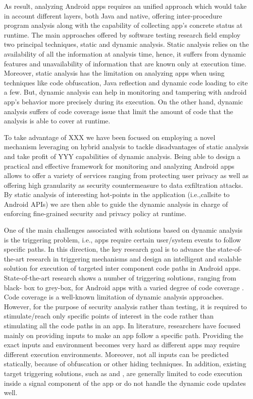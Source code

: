 As result, analyzing Android apps requires an unified approach which would take in account different layers, both Java and native, offering inter-procedure program analysis along with the capability of collecting app's concrete status at runtime. The main approaches offered by software testing research field employ two principal techniques, static and dynamic analysis. Static analysis relies on the availability of all the information at analysis time, hence, it suffers  from dynamic features and unavailability of information that are known only at execution time. Moreover, static analysis has the limitation on analyzing apps when using techniques like code obfuscation, Java reflection and dynamic code loading to cite a few. But, dynamic analysis can help in monitoring and tampering with android app's behavior more precisely during its execution. On the other hand, dynamic analysis suffers of code coverage issue that limit the amount of code that the analysis is able to cover at runtime. 

To take advantage of XXX we have been focused on employing a novel mechanism leveraging on hybrid analysis to tackle disadvantages of static analysis and take profit of YYY capabilities of dynamic analysis. Being able to design a practical and effective framework for monitoring and analyzing Android apps allows to offer a variety of services ranging from protecting user privacy as well as offering high granularity as security countermeasure to data exfiltration attacks. By static analysis of interesting hot-points in the application (i.e.,callsite to Android APIs) we are then able to guide the dynamic analysis in charge of enforcing fine-grained security and privacy policy at runtime.

One of the main challenges associated with solutions based on dynamic analysis is the triggering problem, i.e., apps require certain user/system events to follow specific paths. In this direction, the key research goal is to advance the state-of-the-art research in triggering mechanisms and design an intelligent and scalable solution for execution of targeted inter component code paths in Android apps. State-of-the-art research shows a number of triggering solutions, ranging from black- box to grey-box, for Android apps with a varied degree of code coverage \cite{mirzaei2012testing} \cite{rastogi2013appsplayground} \cite{zheng2012smartdroid} . Code coverage is a well-known limitation of dynamic analysis approaches. However, for the purpose of security analysis rather than testing, it is required to stimulate/reach only specific points of interest in the code rather than stimulating all the code paths in an app. In literature, researchers have focused mainly on providing inputs to make an app follow a specific path. Providing the exact inputs and environment becomes very hard as different apps may require different execution environments. Moreover, not all inputs can be predicted statically, because of obfuscation or other hiding techniques. In addition, existing target triggering solutions, such as \cite{rasthofer2016harvesting} and \cite{backes2016r}, are generally limited to code execution inside a signal component of the app or do not handle the dynamic code updates well.

